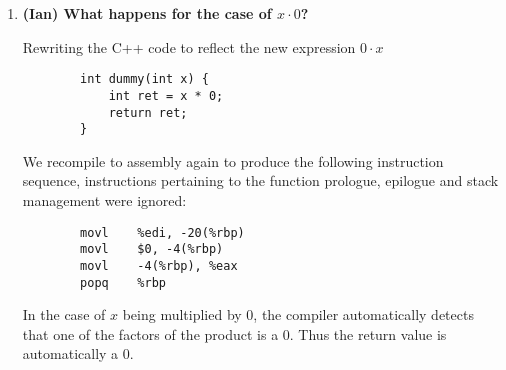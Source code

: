 \documentclass{article}
\begin{document}
\begin{enumerate}
    \item \textbf{(Ian) What happens for the case of \( x \cdot  0 \)?}
    
    Rewriting the C++ code to reflect the new expression \(0 \cdot x\)

    \begin{verbatim}
        int dummy(int x) {
            int ret = x * 0;
            return ret;
        }
    \end{verbatim}

    We recompile to assembly again to produce the following instruction sequence, instructions pertaining to
    the function prologue, epilogue and stack management were ignored:

    \begin{verbatim}
        movl	%edi, -20(%rbp)
        movl	$0, -4(%rbp)
        movl	-4(%rbp), %eax
        popq	%rbp
    \end{verbatim}

    In the case of \(x\) being multiplied by 0, the compiler automatically detects that one of the factors of the
    product is a 0. Thus the return value is automatically a 0.

\end{enumerate}
\end{document}
